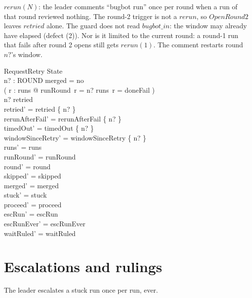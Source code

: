 \documentclass{article}
\begin{document}
$rerun(N)$: the leader comments ``bugbot run'' once per round when a run of
that round reviewed nothing. The round-2 trigger is not a $rerun$, so
$OpenRound2$ leaves $retried$ alone. The guard does not read $bugbot\_in$: the
window may already have elapsed (defect (2)). Nor is it limited to the current
round: a round-1 run that fails after round 2 opens still gets $rerun(1)$.
The comment restarts round $n?$'s window.

\begin{schema}{RequestRetry}
  \Delta State \\
  n? : ROUND
\where
  merged = no \\
  ( \exists r : \dom runs @ runRound~r = n? \land runs~r = doneFail ) \\
  n? \notin retried \\
  retried' = retried \cup \{ n? \} \\
  rerunAfterFail' = rerunAfterFail \cup \{ n? \} \\
  timedOut' = timedOut \setminus \{ n? \} \\
  windowSinceRetry' = windowSinceRetry \setminus \{ n? \} \\
  runs' = runs \\
  runRound' = runRound \\
  round' = round \\
  skipped' = skipped \\
  merged' = merged \\
  stuck' = stuck \\
  proceed' = proceed \\
  escRun' = escRun \\
  escRunEver' = escRunEver \\
  waitRuled' = waitRuled
\end{schema}

\section{Escalations and rulings}

The leader escalates a stuck run once per run, ever.
\end{document}
